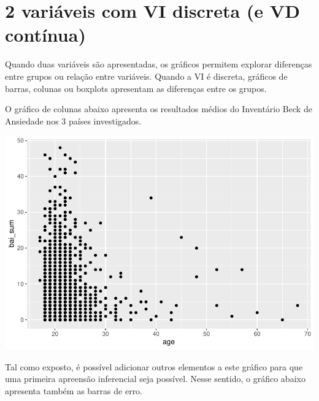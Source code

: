 \documentclass[
]{book}
\newenvironment{Shaded}{\begin{snugshade}}{\end{snugshade}}
\newcommand{\DataTypeTok}[1]{\textcolor[rgb]{0.13,0.29,0.53}{#1}}
\newcommand{\KeywordTok}[1]{\textcolor[rgb]{0.13,0.29,0.53}{\textbf{#1}}}
\newcommand{\NormalTok}[1]{#1}
\newcommand{\OperatorTok}[1]{\textcolor[rgb]{0.81,0.36,0.00}{\textbf{#1}}}
\newcommand{\StringTok}[1]{\textcolor[rgb]{0.31,0.60,0.02}{#1}}
\begin{document}
\hypertarget{variuxe1veis-com-vi-discreta-e-vd-contuxednua}{%
\section{2 variáveis com VI discreta (e VD contínua)}\label{variuxe1veis-com-vi-discreta-e-vd-contuxednua}}

Quando duas variáveis são apresentadas, os gráficos permitem explorar diferenças entre grupos ou relação entre variáveis. Quando a VI é discreta, gráficos de barras, colunas ou boxplots apresentam as diferenças entre os grupos.

O gráfico de colunas abaixo apresenta os resultados médios do Inventário Beck de Ansiedade nos 3 países investigados.

\begin{Shaded}
\end{Shaded}

\begin{center}\includegraphics{gitbook-demo_files/figure-latex/unnamed-chunk-22-1} \end{center}

Tal como exposto, é possível adicionar outros elementos a este gráfico para que uma primeira apreensão inferencial seja possível. Nesse sentido, o gráfico abaixo apresenta também as barras de erro.
\end{document}
